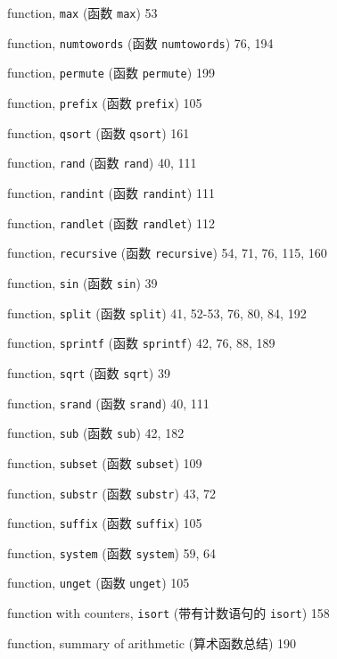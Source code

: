\begin{multicols}{2}
\hangindent=2pc  function, \verb'max' (函数 \verb'max') 53

\hangindent=2pc  function, \verb'numtowords' (函数
\verb'numtowords') 76, 194

\hangindent=2pc  function, \verb'permute' (函数 \verb'permute') 199

\hangindent=2pc  function, \verb'prefix' (函数 \verb'prefix') 105

\hangindent=2pc  function, \verb'qsort' (函数 \verb'qsort') 161

\hangindent=2pc  function, \verb'rand' (函数 \verb'rand') 40, 111

\hangindent=2pc  function, \verb'randint' (函数 \verb'randint') 111

\hangindent=2pc  function, \verb'randlet' (函数 \verb'randlet') 112

\hangindent=2pc  function, \verb'recursive' (函数 \verb'recursive')
54, 71, 76, 115, 160

\hangindent=2pc  function, \verb'sin' (函数 \verb'sin') 39

\hangindent=2pc  function, \verb'split' (函数 \verb'split')
41, 52-53, 76, 80, 84, 192

\hangindent=2pc  function, \verb'sprintf' (函数 \verb'sprintf')
42, 76, 88, 189

\hangindent=2pc  function, \verb'sqrt' (函数 \verb'sqrt') 39

\hangindent=2pc  function, \verb'srand' (函数 \verb'srand') 40, 111

\hangindent=2pc  function, \verb'sub' (函数 \verb'sub') 42, 182

\hangindent=2pc  function, \verb'subset' (函数 \verb'subset') 109

\hangindent=2pc  function, \verb'substr' (函数 \verb'substr') 43, 72

\hangindent=2pc  function, \verb'suffix' (函数 \verb'suffix') 105

\hangindent=2pc  function, \verb'system' (函数 \verb'system') 59, 64

\hangindent=2pc  function, \verb'unget' (函数 \verb'unget') 105

\hangindent=2pc  function with counters, \verb'isort'
(带有计数语句的 \verb'isort') 158

\hangindent=2pc  function, summary of arithmetic (算术函数总结) 190


\end{multicols}
